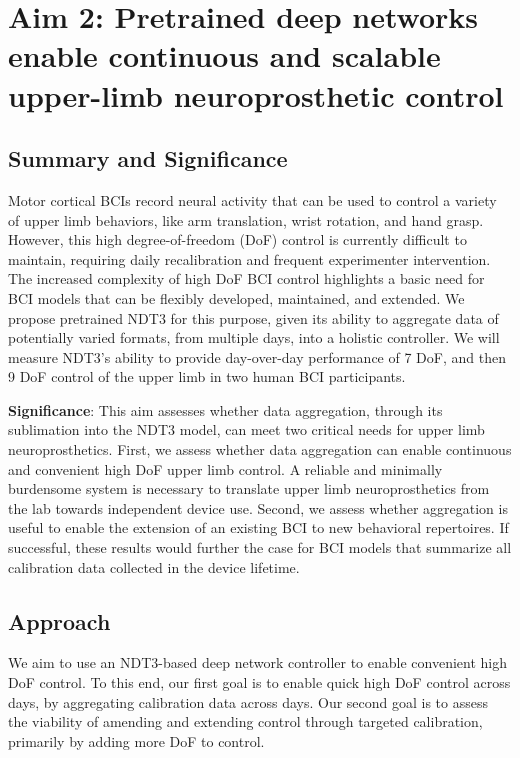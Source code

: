 \documentclass[12pt,oneside]{report}
\begin{document}
\chapter{Aim 2: Pretrained deep networks enable continuous and scalable upper-limb neuroprosthetic control}

\section{Summary and Significance}
Motor cortical BCIs record neural activity that can be used to control a variety of upper limb behaviors, like arm translation, wrist rotation, and hand grasp.
However, this high degree-of-freedom (DoF) control is currently difficult to maintain, requiring daily recalibration and frequent experimenter intervention.
The increased complexity of high DoF BCI control highlights a basic need for BCI models that can be flexibly developed, maintained, and extended.
We propose pretrained NDT3 for this purpose, given its ability to aggregate data of potentially varied formats, from multiple days, into a holistic controller.
We will measure NDT3's ability to provide day-over-day performance of 7 DoF, and then 9 DoF control of the upper limb in two human BCI participants.

\textbf{Significance}: This aim assesses whether data aggregation, through its sublimation into the NDT3 model, can meet two critical needs for upper limb neuroprosthetics. First, we assess whether data aggregation can enable continuous and convenient high DoF upper limb control. A reliable and minimally burdensome system is necessary to translate upper limb neuroprosthetics from the lab towards independent device use. Second, we assess whether aggregation is useful to enable the extension of an existing BCI to new behavioral repertoires. If successful, these results would further the case for BCI models that summarize all calibration data collected in the device lifetime.

\section{Approach}
We aim to use an NDT3-based deep network controller to enable convenient high DoF control. To this end, our first goal is to enable quick high DoF control across days, by aggregating calibration data across days. Our second goal is to assess the viability of amending and extending control through targeted calibration, primarily by adding more DoF to control.
\end{document}

